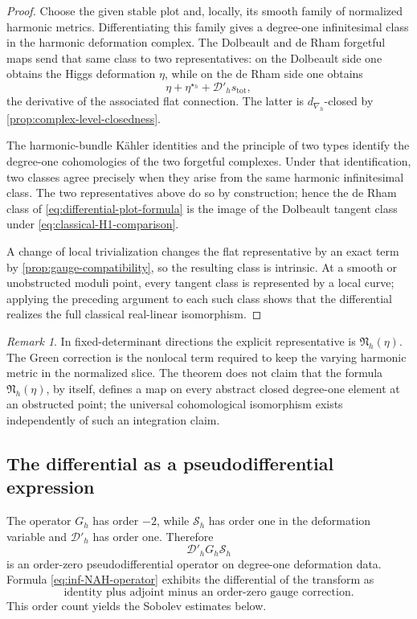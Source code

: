 \documentclass[11pt,reqno]{amsart}
\theoremstyle{definition}
\theoremstyle{remark}
\newtheorem{remark}[theorem]{Remark}
\newcommand{\cD}{\mathcal D}
\newcommand{\cS}{\mathcal S}
\begin{document}
\begin{proof}
Choose the given stable plot and, locally, its smooth family of normalized harmonic metrics.  Differentiating this family gives a degree-one infinitesimal class in the harmonic deformation complex.  The Dolbeault and de Rham forgetful maps send that same class to two representatives: on the Dolbeault side one obtains the Higgs deformation $\eta$, while on the de Rham side one obtains
\[
  \eta+\eta^{\star_h}+\cD'_hs_{\mathrm{tot}},
\]
the derivative of the associated flat connection.  The latter is $d_{\nabla_h}$-closed by \cref{prop:complex-level-closedness}.

The harmonic-bundle K\"ahler identities and the principle of two types identify the degree-one cohomologies of the two forgetful complexes.  Under that identification, two classes agree precisely when they arise from the same harmonic infinitesimal class.  The two representatives above do so by construction; hence the de Rham class of \eqref{eq:differential-plot-formula} is the image of the Dolbeault tangent class under \eqref{eq:classical-H1-comparison}.

A change of local trivialization changes the flat representative by an exact term by \cref{prop:gauge-compatibility}, so the resulting class is intrinsic.  At a smooth or unobstructed moduli point, every tangent class is represented by a local curve; applying the preceding argument to each such class shows that the differential realizes the full classical real-linear isomorphism.
\end{proof}

\begin{remark}
In fixed-determinant directions the explicit representative is $\mathfrak N_h(\eta)$.  The Green correction is the nonlocal term required to keep the varying harmonic metric in the normalized slice.  The theorem does not claim that the formula $\mathfrak N_h(\eta)$, by itself, defines a map on every abstract closed degree-one element at an obstructed point; the universal cohomological isomorphism exists independently of such an integration claim.
\end{remark}

\subsection{The differential as a pseudodifferential expression}

The operator $G_h$ has order $-2$, while $\cS_h$ has order one in the deformation variable and $\cD'_h$ has order one.  Therefore
\[
  \cD'_hG_h\cS_h
\]
is an order-zero pseudodifferential operator on degree-one deformation data.  Formula \eqref{eq:inf-NAH-operator} exhibits the differential of the transform as
\[
  \text{identity plus adjoint minus an order-zero gauge correction}.
\]
This order count yields the Sobolev estimates below.
\end{document}
